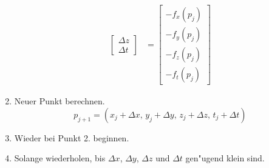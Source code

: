\begin{refsection}
\begin{enumerate}
\begin{align*}
\begin{bmatrix}
\Delta z \\
\Delta t 
\end{bmatrix}&= \begin{bmatrix} 
-f_x(p_j) \\
-f_y(p_j) \\
-f_z(p_j) \\
-f_t(p_j) 
\end{bmatrix}
\end{align*}
\item Neuer Punkt berechnen.
\[
p_{j+1} = (x_j + \Delta x,\,y_j + \Delta y,\,z_j + \Delta z,\,t_j + \Delta t)
\]
\item Wieder bei Punkt 2. beginnen.
\item Solange wiederholen, bis $\Delta x$, $\Delta y$, $\Delta z$
und $\Delta t$ gen"ugend klein sind. 
\end{enumerate}


\end{refsection}

